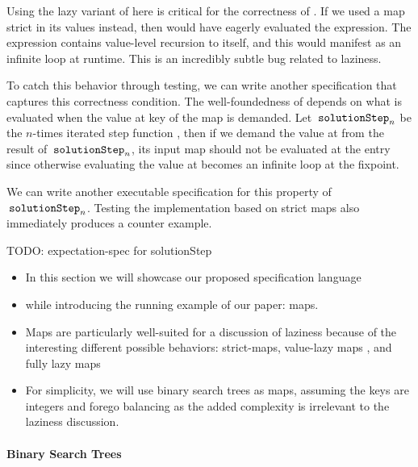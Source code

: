 \documentclass[acmsmall,review]{acmart}\settopmatter{}
\begin{document}
Using the lazy variant of  here is critical for the
correctness of . If we used a map strict in its values
instead, then  would have eagerly evaluated the 
expression. The  expression contains value-level recursion to
 itself, and this would manifest as an infinite loop
at runtime. This is an incredibly subtle bug related to laziness.

To catch this behavior through testing, we can write another specification that
captures this correctness condition. The well-foundedness 
of  depends on what is evaluated when the value at key 
of the map is demanded. Let $\lk{solutionStep}_n$ be the $n$-times iterated
step function , then if we
demand the value at  from the result of $\lk{solutionStep}_n$, its
input map should not be evaluated at the  entry since otherwise
evaluating the value at  becomes an infinite loop at the fixpoint.

We can write another executable specification for this property
of $\lk{solutionStep}_n$. Testing the implementation based on
strict maps also immediately produces a counter example.
%
\begin{inlinecode}
TODO: expectation-spec for solutionStep
\end{inlinecode}
%


\begin{itemize}
\item In this section we will showcase our proposed specification language 
\item while introducing the running example of our paper: maps.
\item Maps are particularly well-suited for a discussion of laziness because of the interesting different
possible behaviors: strict-maps, value-lazy maps , and fully lazy maps
\item For simplicity, we will use binary search trees as maps, assuming the keys are integers and forego balancing
as the added complexity is irrelevant to the laziness discussion. 
\end{itemize}

\paragraph*{Binary Search Trees}
\end{document}
